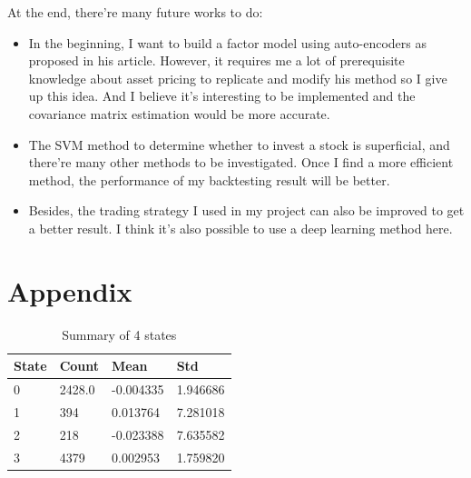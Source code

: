 \documentclass[a4paper,12pt]{article}
\begin{document}
At the end, there're many future works to do:

\begin{itemize}
    \item In the beginning, I want to build a factor model using auto-encoders as \cite{gu_autoencoder_2021} proposed in his article. However, it requires me a lot of prerequisite knowledge about asset pricing to replicate and modify his method so I give up this idea. And I believe it's interesting to be implemented and the covariance matrix estimation would be more accurate.
    \item The SVM method to determine whether to invest a stock is superficial, and there're many other methods to be investigated. Once I find a more efficient method, the performance of my backtesting result will be better.
    \item Besides, the trading strategy I used in my project can also be improved to get a better result. I think it's also possible to use a deep learning method here.
\end{itemize}

\section{Appendix}

\begin{table}[H]
    \centering
    \begin{tabular}{|l|l|l|l|}
    \hline
    State & Count  & Mean                           & Std                           \\ \hline
    0     & 2428.0 & -0.004335                      & \multicolumn{1}{r|}{1.946686} \\ \hline
    1     & 394    & 0.013764                       & 7.281018                      \\ \hline
    2     & 218    & \multicolumn{1}{r|}{-0.023388} & 7.635582                      \\ \hline
    3     & 4379   & 0.002953                       & \multicolumn{1}{r|}{1.759820} \\ \hline
    \end{tabular}
    \caption{Summary of 4 states}
    \label{table_4states}
\end{table}




\end{document}
